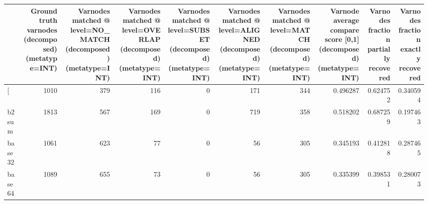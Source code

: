 \begin{tabular}{lrrrrrrrrr}
\toprule
{} &  Ground truth varnodes (decomposed) (metatype=INT) &  Varnodes matched @ level=NO\_MATCH (decomposed) (metatype=INT) &  Varnodes matched @ level=OVERLAP (decomposed) (metatype=INT) &  Varnodes matched @ level=SUBSET (decomposed) (metatype=INT) &  Varnodes matched @ level=ALIGNED (decomposed) (metatype=INT) &  Varnodes matched @ level=MATCH (decomposed) (metatype=INT) &  Varnode average compare score [0,1] (decomposed) (metatype=INT) &  Varnodes fraction partially recovered &  Varnodes fraction exactly recovered \\
\midrule
[         &                                               1010 &                                                379 &                                                116 &                                                  0 &                                                171 &                                                344 &                                           0.496287 &                               0.624752 &                             0.340594 \\
b2sum     &                                               1813 &                                                567 &                                                169 &                                                  0 &                                                719 &                                                358 &                                           0.518202 &                               0.687259 &                             0.197463 \\
base32    &                                               1061 &                                                623 &                                                 77 &                                                  0 &                                                 56 &                                                305 &                                           0.345193 &                               0.412818 &                             0.287465 \\
base64    &                                               1089 &                                                655 &                                                 73 &                                                  0 &                                                 56 &                                                305 &                                           0.335399 &                               0.398531 &                             0.280073 \\

\end{tabular}
